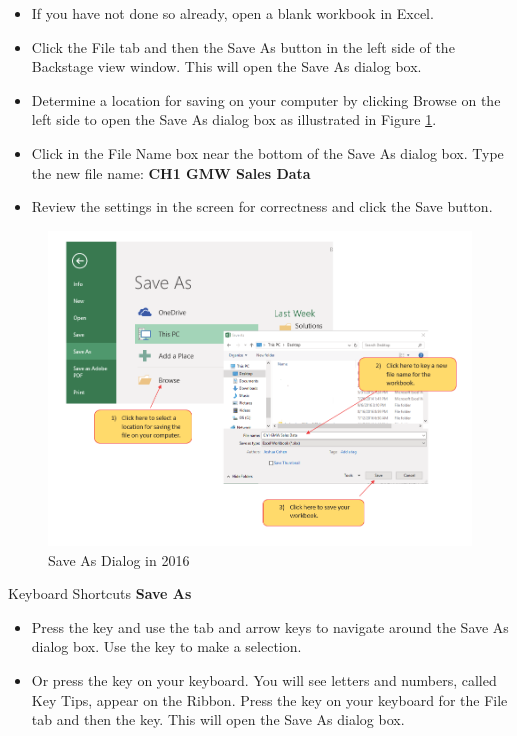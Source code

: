 \begin{itemize}
	\item If you have not done so already, open a blank workbook in Excel.
	\item Click the File tab and then the Save As button in the left side of the Backstage view window. This will open the Save As dialog box.
	\item Determine a location for saving on your computer by clicking Browse on the left side to open the Save As dialog box as illustrated in Figure \ref{01:fig12}.
	\item Click in the File Name box near the bottom of the Save As dialog box. Type the new file name: \textbf{CH1 GMW Sales Data}
	\item Review the settings in the screen for correctness and click the Save button.
\end{itemize}

\begin{figure}[H]
	\centering
	\includegraphics[width=\maxwidth{.95\linewidth}]{gfx/ch01_fig12}
	\caption{Save As Dialog in 2016}
	\label{01:fig12}
\end{figure}

\begin{center}
	\begin{shtcutbox}{Keyboard Shortcuts}
		\textbf{Save As}
		\\
		\begin{itemize}
			\setlength{\itemsep}{0pt}
			\setlength{\parskip}{0pt}
			\setlength{\parsep}{0pt}
			
			\item Press the  key and use the tab and arrow keys to navigate around the Save As dialog box. Use the  key to make a selection.
			\item Or press the  key on your keyboard. You will see letters and numbers, called Key Tips, appear on the Ribbon. Press the  key on your keyboard for the File tab and then the  key. This will open the Save As dialog box.
			
		\end{itemize}
	\end{shtcutbox}
\end{center}

